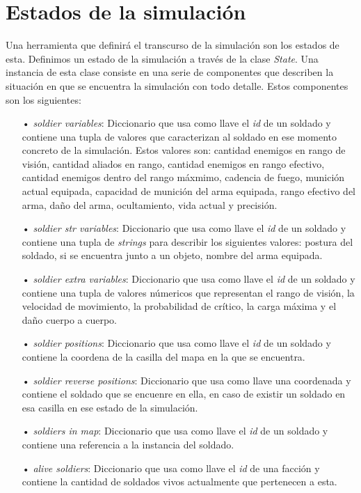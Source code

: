 \documentclass[twoside]{article}
\begin{document}
\section{Estados de la simulaci\'on}

Una herramienta que definir\'a el transcurso de la simulaci\'on son los estados de esta. Definimos un estado de la simulaci\'on a trav\'es de la clase \emph{State}. Una instancia de esta clase consiste en una serie de componentes que describen la situaci\'on en que se encuentra la simulaci\'on con todo detalle. Estos componentes son los siguientes:\\

\begin{itemize}
	\item[•] \emph{soldier variables}: Diccionario que usa como llave el \emph{id} de un soldado y contiene una tupla de valores que caracterizan al soldado en ese momento concreto de la simulaci\'on. Estos valores son: cantidad enemigos en rango de visi\'on, cantidad aliados en rango, cantidad enemigos en rango efectivo, cantidad enemigos dentro del rango m\'axmimo, cadencia de fuego, munici\'on actual equipada, capacidad de munici\'on del arma equipada, rango efectivo del arma, da\~no del arma, ocultamiento, vida actual y precisi\'on.
	\item[•] \emph{soldier str variables}: Diccionario que usa como llave el \emph{id} de un soldado y contiene una tupla de \emph{strings} para describir los siguientes valores: postura del soldado, si se encuentra junto a un objeto, nombre del arma equipada.
	\item[•] \emph{soldier extra variables}: Diccionario que usa como llave el \emph{id} de un soldado y contiene una tupla de 
	valores n\'umericos que representan el rango de visi\'on, la velocidad de movimiento, la probabilidad de cr\'itico, la carga m\'axima y el da\~no cuerpo a cuerpo.
	\item[•] \emph{soldier positions}: Diccionario que usa como llave el \emph{id} de un soldado y contiene la coordena de la casilla del mapa en la que se encuentra.
	\item[•] \emph{soldier reverse positions}: Diccionario que usa como llave una coordenada y contiene el soldado que se encuenre en ella, en caso de existir un soldado en esa casilla en ese estado de la simulaci\'on.
	\item[•] \emph{soldiers in map}: Diccionario que usa como llave el \emph{id} de un soldado y contiene una referencia a la instancia del soldado.
	\item[•] \emph{alive soldiers}: Diccionario que usa como llave el \emph{id} de una facci\'on y contiene la cantidad de soldados vivos actualmente que pertenecen a esta.

\end{itemize}
\end{document}
